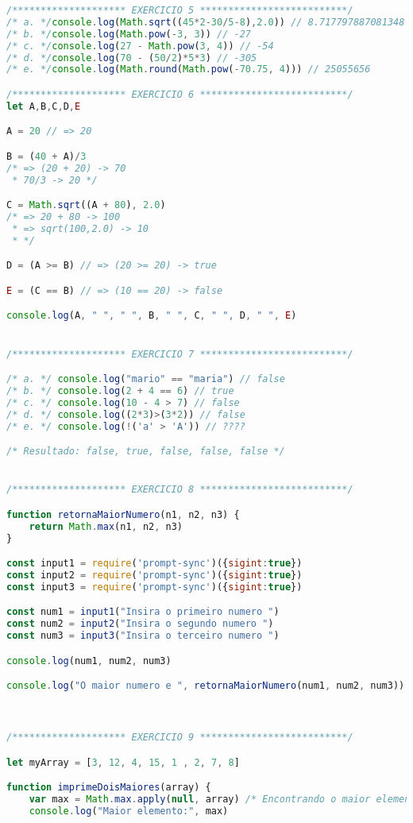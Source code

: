 \documentclass{scrreprt}
\begin{document}
\begin{lstlisting}[language=JavaScript]
/******************** EXERCICIO 5 **************************/
/* a. */console.log(Math.sqrt((45*2-30/5-8),2.0)) // 8.717797887081348
/* b. */console.log(Math.pow(-3, 3)) // -27 
/* c. */console.log(27 - Math.pow(3, 4)) // -54 
/* d. */console.log(70 - (50/2)*5*3) // -305
/* e. */console.log(Math.round(Math.pow(-70.75, 4))) // 25055656 

/******************** EXERCICIO 6 **************************/
let A,B,C,D,E

A = 20 // => 20

B = (40 + A)/3 
/* => (20 + 20) -> 70 
 * 70/3 -> 20 */

C = Math.sqrt((A + 80), 2.0)
/* => 20 + 80 -> 100
 * => sqrt(100,2.0) -> 10
 * */

D = (A >= B) // => (20 >= 20) -> true

E = (C == B) // => (10 == 20) -> false

console.log(A, " ", " ", B, " ", C, " ", D, " ", E)


/******************** EXERCICIO 7 **************************/

/* a. */ console.log("mario" == "maria") // false
/* b. */ console.log(2 + 4 == 6) // true
/* c. */ console.log(10 - 4 > 7) // false
/* d. */ console.log((2*3)>(3*2)) // false
/* e. */ console.log(!('a' > 'A')) // ????

/* Resultado: false, true, false, false, false */


/******************** EXERCICIO 8 **************************/

function retornaMaiorNumero(n1, n2, n3) {
	return Math.max(n1, n2, n3)
}

const input1 = require('prompt-sync')({sigint:true})
const input2 = require('prompt-sync')({sigint:true})
const input3 = require('prompt-sync')({sigint:true})

const num1 = input1("Insira o primeiro numero ")
const num2 = input2("Insira o segundo numero ")
const num3 = input3("Insira o terceiro numero ")

console.log(num1, num2, num3)

console.log("O maior numero e ", retornaMaiorNumero(num1, num2, num3))



/******************** EXERCICIO 9 **************************/

let myArray = [3, 12, 4, 15, 1 , 2, 7, 8]

function imprimeDoisMaiores(array) { 
	var max = Math.max.apply(null, array) /* Encontrando o maior elemento */ 
	console.log("Maior elemento:", max)


\end{lstlisting}
\end{document}
